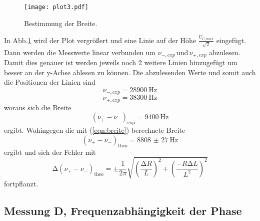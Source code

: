 \begin{figure}
  \centering
  \texttt{[image: plot3.pdf]}
  \caption{Bestimmung der Breite.}
  \label{fig:plot3}
\end{figure}

In Abb.\ref{fig:plot3} wird der Plot vergrößert und eine Linie auf der Höhe
$\frac{U_{C,max}}{\sqrt{2}}$ eingefügt. Dann werden die Messwerte linear
verbunden um $\nu_{-,exp}\, \text{und}\,\nu_{+,exp}$ abzulesen. Damit dies
genauer ist werden jeweils noch 2 weitere Linien hinzugefügt um besser an der y-Achse
ablesen zu können.
Die abzulesenden Werte und somit auch die Positionen der Linien sind
\begin{equation*}
  \nu_{-,exp} = \SI{28900}{\hertz}
\end{equation*}
\begin{equation*}
  \nu_{+,exp} = \SI{38300}{\hertz}
\end{equation*}
woraus sich die Breite
\begin{equation*}
  (\nu_{+}-\nu_{-})_{\text{exp}} = \SI{9400}{\hertz}
\end{equation*}
ergibt. Wohingegen die mit (\ref{eqn:breite}) berechnete Breite
\begin{equation*}
  (\nu_{+}-\nu_{-})_{\text{theo}} = \SI{8808(27)}{\hertz}
\end{equation*}
ergibt und sich der Fehler mit
\begin{equation*}
  \increment (\nu_{+}-\nu_{-})_{\text{theo}} = \pm \frac{1}{2\pi}\sqrt{
  \left(\frac{\increment R}{L}\right)^2 +
  \left(\frac{-R\increment L}{L^2}\right)^2}
\end{equation*}
fortpflanzt.

\subsection{Messung D, Frequenzabhängigkeit der Phase}

